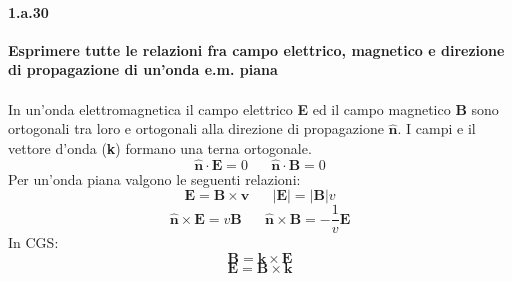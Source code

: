 \documentclass[twoside]{article}
\begin{document}
\paragraph{1.a.30}\textbf{Esprimere tutte le relazioni fra campo elettrico, magnetico e direzione di propagazione di un’onda e.m. piana}\\
\\
In un'onda elettromagnetica il campo elettrico \textbf{E} ed il campo magnetico \textbf{B} sono ortogonali tra loro e ortogonali alla direzione di propagazione $\widehat{\textbf{n}}$. I campi e il vettore d'onda (\textbf{k}) formano una terna ortogonale.
\[
\widehat{\textbf{n}} \cdot \textbf{E} = 0 \;\;\;\;\;\; \widehat{\textbf{n}} \cdot \textbf{B} = 0
\]
Per un'onda piana valgono le seguenti relazioni:
\[
\textbf{E}=\textbf{B} \times \textbf{v} \;\;\;\;\;\; |\textbf{E}|=|\textbf{B}|v
\]
\[
\widehat{\textbf{n}} \times \textbf{E}=v\textbf{B}
 \;\;\;\;\;\; \widehat{\textbf{n}} \times \textbf{B}=-\frac{1}{v}\textbf{E}
\]
In CGS:
\[
\textbf{B}=\textbf{k} \times \textbf{E}
\]
\[
\textbf{E}=  \textbf{B} \times \textbf{k}
\]
\end{document}
